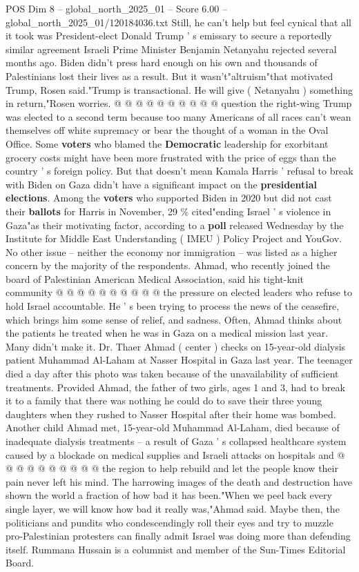 \begin{textsample}{POS Dim 8 – global\_north\_2025\_01 – Score 6.00 – global\_north\_2025\_01/120184036.txt}
Still, he can't help but feel cynical that all it took was President-elect Donald Trump ' s emissary to secure a reportedly similar agreement Israeli Prime Minister Benjamin Netanyahu rejected several months ago.
Biden didn't press hard enough on his own and thousands of Palestinians lost their lives as a result.
But it wasn't"altruism"that motivated Trump, Rosen said."Trump is transactional.
He will give ( Netanyahu ) something in return,"Rosen worries. @ @ @ @ @ @ @ @ @ @ question the right-wing Trump was elected to a second term because too many Americans of all races can't wean themselves off white supremacy or bear the thought of a woman in the Oval Office.
Some \textbf{voters} who blamed the \textbf{Democratic} leadership for exorbitant grocery costs might have been more frustrated with the price of eggs than the country ' s foreign policy.
But that doesn't mean Kamala Harris ' refusal to break with Biden on Gaza didn't have a significant impact on the \textbf{presidential} \textbf{elections}.
Among the \textbf{voters} who supported Biden in 2020 but did not cast their \textbf{ballots} for Harris in November, 29 \% cited"ending Israel ' s violence in Gaza"as their motivating factor, according to a \textbf{poll} released Wednesday by the Institute for Middle East Understanding ( IMEU ) Policy Project and YouGov.
No other issue -- neither the economy nor immigration -- was listed as a higher concern by the majority of the respondents.
Ahmad, who recently joined the board of Palestinian American Medical Association, said his tight-knit community @ @ @ @ @ @ @ @ @ @ the pressure on elected leaders who refuse to hold Israel accountable.
He ' s been trying to process the news of the ceasefire, which brings him some sense of relief, and sadness.
Often, Ahmad thinks about the patients he treated when he was in Gaza on a medical mission last year.
Many didn't make it.
Dr.
Thaer Ahmad ( center ) checks on 15-year-old dialysis patient Muhammad Al-Laham at Nasser Hospital in Gaza last year.
The teenager died a day after this photo was taken because of the unavailability of sufficient treatments.
Provided Ahmad, the father of two girls, ages 1 and 3, had to break it to a family that there was nothing he could do to save their three young daughters when they rushed to Nasser Hospital after their home was bombed.
Another child Ahmad met, 15-year-old Muhammad Al-Laham, died because of inadequate dialysis treatments -- a result of Gaza ' s collapsed healthcare system caused by a blockade on medical supplies and Israeli attacks on hospitals and @ @ @ @ @ @ @ @ @ @ the region to help rebuild and let the people know their pain never left his mind.
The harrowing images of the death and destruction have shown the world a fraction of how bad it has been."When we peel back every single layer, we will know how bad it really was,"Ahmad said.
Maybe then, the politicians and pundits who condescendingly roll their eyes and try to muzzle pro-Palestinian protesters can finally admit Israel was doing more than defending itself.
Rummana Hussain is a columnist and member of the Sun-Times Editorial Board.

\end{textsample}
